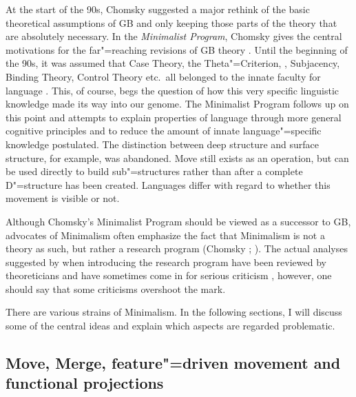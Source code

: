 At the start of the 90s, Chomsky suggested a major rethink of the basic theoretical assumptions of GB and only keeping
those parts of the theory that are absolutely necessary. In the \emph{Minimalist Program}, Chomsky gives the central motivations for the far"=reaching
revisions of GB theory \citep{Chomsky93b-u,Chomsky95a-u}. Until the beginning of the 90s, it was
assumed that Case Theory, the Theta"=Criterion, \xbart, Subjacency, Binding
Theory, Control Theory etc.\ all belonged to the innate faculty
for language \citep[]{Richards2015a}. This, of 
course, begs the question of how this very specific linguistic knowledge made its way into our genome. The Minimalist Program follows up on this
point and attempts to explain properties of language through more general cognitive principles and to reduce the amount of innate language"=specific 
knowledge postulated. The distinction between deep structure and surface structure, for example, was abandoned.
Move still exists as an operation, but can be used directly to build sub"=structures rather than after a complete D"=structure has been created.
Languages differ with regard to whether this movement is visible or not.

Although Chomsky's Minimalist Program should be viewed as a successor to GB, advocates of Minimalism often emphasize the fact that Minimalism is not
a theory as such, but rather a research program (Chomsky \citeyear[]{Chomsky2007a};
\citeyear[]{Chomsky2013a}). The actual analyses suggested by \citet{Chomsky95a-u} when introducing the research program have been reviewed by theoreticians and have sometimes come in for serious criticism
\citep*{Kolb97a,JL97a-u,JL99a-u,LLJ2000b,LLJ2000a,LLJ2001a,Seuren2004a,PJ2005a},
however, one should say that some criticisms overshoot the mark.

There are various strains of Minimalism. In the following sections, I will discuss some of the
central ideas and explain which aspects are regarded problematic.

\subsection{Move, Merge, feature"=driven movement and functional projections}
\label{Abschnitt-merkmalsgetriebene-Bewegung}
\label{Abschnitt-MP-funktionale-Projektionen}\label{sec-functional-projections-minimalism}
\label{Abschnitt-Kaynesche-Modelle}

